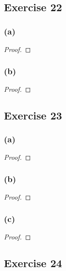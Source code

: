 \documentclass[14pt]{extarticle}
\begin{document}
\subsection{Exercise 22}

\subsubsection{(a)}

\begin{proof}

\end{proof}

\subsubsection{(b)}

\begin{proof}

\end{proof}

\subsection{Exercise 23}

\subsubsection{(a)}

\begin{proof}

\end{proof}

\subsubsection{(b)}

\begin{proof}

\end{proof}

\subsubsection{(c)}

\begin{proof}

\end{proof}

\subsection{Exercise 24}
\end{document}
